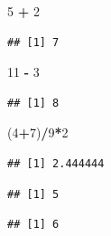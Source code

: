 \documentclass[]{book}
\newenvironment{Shaded}{\begin{snugshade}}{\end{snugshade}}
\newcommand{\DecValTok}[1]{\textcolor[rgb]{0.00,0.00,0.81}{#1}}
\newcommand{\StringTok}[1]{\textcolor[rgb]{0.31,0.60,0.02}{#1}}
\newcommand{\OperatorTok}[1]{\textcolor[rgb]{0.81,0.36,0.00}{\textbf{#1}}}
\newcommand{\NormalTok}[1]{#1}
\theoremstyle{definition}
\theoremstyle{definition}
\theoremstyle{definition}
\theoremstyle{remark}
\begin{document}
\begin{Shaded}
\begin{Highlighting}[]
\DecValTok{5} \OperatorTok{+}\StringTok{ }\DecValTok{2}
\end{Highlighting}
\end{Shaded}

\begin{verbatim}
## [1] 7
\end{verbatim}

\begin{Shaded}
\begin{Highlighting}[]
\DecValTok{11} \OperatorTok{-}\StringTok{ }\DecValTok{3}
\end{Highlighting}
\end{Shaded}

\begin{verbatim}
## [1] 8
\end{verbatim}

\begin{Shaded}
\begin{Highlighting}[]
\NormalTok{(}\DecValTok{4}\OperatorTok{+}\DecValTok{7}\NormalTok{)}\OperatorTok{/}\DecValTok{9}\OperatorTok{*}\DecValTok{2}
\end{Highlighting}
\end{Shaded}

\begin{verbatim}
## [1] 2.444444
\end{verbatim}

\begin{Shaded}
\end{Shaded}

\begin{verbatim}
## [1] 5
\end{verbatim}

\begin{Shaded}
\end{Shaded}

\begin{verbatim}
## [1] 6
\end{verbatim}
\end{document}
